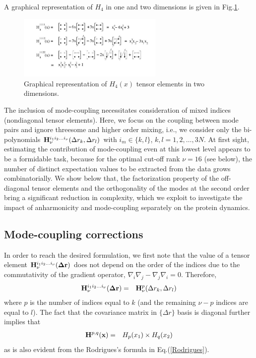 \documentclass{article}
\begin{document}
A graphical representation of $H_4$ in one and two dimensions is given in Fig.\ref{Fig1}. 
\begin{figure}
\vspace*{2cm}
  \begin{center}
    \includegraphics[width=7cm]{./Fig1.jpg}
  \end{center}
\caption{ Graphical representation of $H_4(x)$ tensor elements in two dimensions.}
\label{Fig1}
\end{figure}


The inclusion of mode-coupling necessitates consideration of mixed
indices (nondiagonal tensor elements). Here, we focus on the coupling
between mode pairs and ignore threesome and higher order mixing, i.e.,
we consider only the bi-polynomials ${\bf H}^{i_1i_2\dots
  i_\nu}_\nu(\Delta r_k,\Delta r_l)$ with $i_m \in \{k,l\}$,
$k,l=1,2,\dots,3N$. At first sight, estimating the contribution of
mode-coupling even at this lowest level appears to be a formidable
task, because for the optimal cut-off rank $\nu=16$ (see below), the
number of distinct expectation values to be extracted from the data
grows combinatorially. We show below that, the factorization property
of the off-diagonal tensor elements and the orthogonality of the modes
at the second order bring a significant reduction in complexity, which
we exploit to investigate the impact of anharmonicity and
mode-coupling separately on the protein dynamics.

\subsection{Mode-coupling corrections}
In order to reach the desired formulation, we first note that the value
of a tensor element ${\bf H}^{i_1i_2\dots i_\nu}_\nu({\bf \Delta r})$
does not depend on the order of the indices due to the commutativity
of the gradient operator, $\nabla_i\nabla_j -
\nabla_j\nabla_i=0$. Therefore,
\begin{eqnarray}
{\bf H}^{i_1i_2\dots i_\nu}_\nu({\bf \Delta r}) &=& {\bf H}^p_\nu(\Delta r_k,\Delta r_l) \nonumber \\
\end{eqnarray}
where $p$ is the number of indices equal to $k$ (and the remaining
$\nu-p$ indices are equal to $l$). The fact that the covariance matrix
in $\{\Delta r\}$ basis is diagonal further implies that
\begin{eqnarray}
\label{factorization}
{\bf H}^{p,q}({\bf x}) &=& H_p(x_1)\times H_q(x_2)
\end{eqnarray}
as is also evident from the Rodrigues's formula in Eq.(\ref{Rodrigues}).
\end{document}
